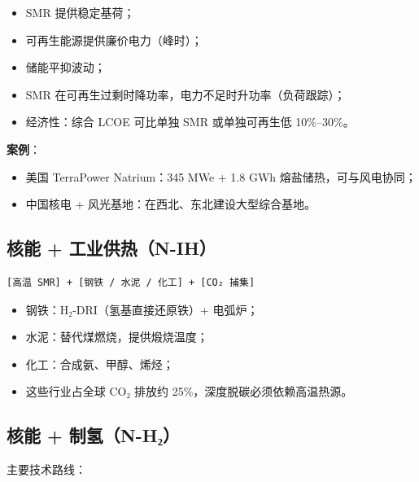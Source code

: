 \documentclass[
  UTF8,
  scheme=plain,
  fontsize=10pt,
  openany
]{ctexbook}
\begin{document}
\begin{itemize}
\tightlist
\item
  SMR 提供稳定基荷；
\item
  可再生能源提供廉价电力（峰时）；
\item
  储能平抑波动；
\item
  SMR 在可再生过剩时降功率，电力不足时升功率（负荷跟踪）；
\item
  经济性：综合 LCOE 可比单独 SMR 或单独可再生低 10\%--30\%。
\end{itemize}

\textbf{案例}：

\begin{itemize}
\tightlist
\item
  美国 TerraPower Natrium：345 MWe + 1.8 GWh 熔盐储热，可与风电协同；
\item
  中国核电 + 风光基地：在西北、东北建设大型综合基地。
\end{itemize}

\subsection{核能 +
工业供热（N-IH）}\label{ux6838ux80fd-ux5de5ux4e1aux4f9bux70edn-ih}

\begin{verbatim}[高温 SMR] + [钢铁 / 水泥 / 化工] + [CO₂ 捕集]\end{verbatim}

\begin{itemize}
\tightlist
\item
  钢铁：H₂-DRI（氢基直接还原铁）+ 电弧炉；
\item
  水泥：替代煤燃烧，提供煅烧温度；
\item
  化工：合成氨、甲醇、烯烃；
\item
  这些行业占全球 CO₂ 排放约 25\%，深度脱碳必须依赖高温热源。
\end{itemize}

\subsection{核能 +
制氢（N-H₂）}\label{ux6838ux80fd-ux5236ux6c22n-hux2082}

主要技术路线：
\end{document}
